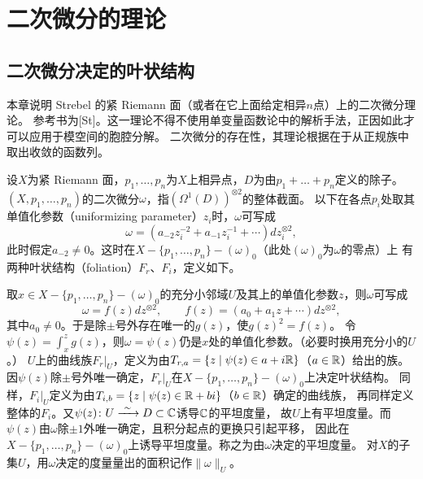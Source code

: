 
\section{二次微分的理论}
\subsection{二次微分决定的叶状结构}

本章说明 Strebel 的紧 Riemann 面（或者在它上面给定相异$n$点）上的二次微分理论。
参考书为[St]。这一理论不得不使用单变量函数论中的解析手法，正因如此才可以应用于模空间的胞腔分解。
二次微分的存在性，其理论根据在于从正规族中取出收敛的函数列。

设$X$为紧 Riemann 面，$p_1,\dots,p_n$为$X$上相异点，$D$为由$p_1+\dots+p_n$定义的除子。
$(X,p_1,\dots,p_n)$的二次微分$\omega$，指$(\Omega^1(D))^{\otimes2}$的整体截面。
以下在各点$p_i$处取其单值化参数（uniformizing parameter）$z_i$时，$\omega$可写成
\[
\omega=(a_{-2}z_i^{-2}+a_{-1}z_i^{-1}+\cdots)dz_i^{\otimes2},
\]
此时假定$a_{-2}\neq0$。这时在$X-\{p_1,\dots,p_n\}-(\omega)_0$（此处$(\omega)_0$为$\omega$的零点）上
有两种叶状结构（foliation）$F_r$、$F_i$，定义如下。

取$x\in X-\{p_1,\dots,p_n\}-(\omega)_0$的充分小邻域$U$及其上的单值化参数$z$，则$\omega$可写成
\[
\omega=f(z)dz^{\otimes2},\qquad f(z)=(a_0+a_1z+\cdots)dz^{\otimes2},
\]
其中$a_0\neq0$。于是除$\pm$号外存在唯一的$g(z)$，使$g(z)^2=f(z)$。
令$\psi(z)=\int_x^zg(z)$，则$\omega=\psi(z)$仍是$x$处的单值化参数。（必要时换用充分小的$U$。）
$U$上的曲线族$F_r|_U$，定义为由$T_{r,a}=\{z\mid\psi(z)\in a+i\mathbb{R}\}$（$a\in\mathbb{R}$）给出的族。
因$\psi(z)$除$\pm$号外唯一确定，$F_r|_U$在$X-\{p_1,\dots,p_n\}-(\omega)_0$上决定叶状结构。
同样，$F_i|_U$定义为由$T_{i,b}=\{z\mid\psi(z)\in\mathbb{R}+bi\}$（$b\in\mathbb{R}$）确定的曲线族，
再同样定义整体的$F_i$。又$\psi(z)\colon U\xrightarrow{\ \sim\ }D\subset\C$诱导$\mathbb{C}$的平坦度量，
故$U$上有平坦度量。而$\psi(z)$由$\omega$除$\pm1$外唯一确定，且积分起点的更换只引起平移，
因此在$X-\{p_1,\dots,p_n\}-(\omega)_0$上诱导平坦度量。称之为由$\omega$决定的平坦度量。
对$X$的子集$U$，用$\omega$决定的度量量出的面积记作$\|\omega\|_U$。

